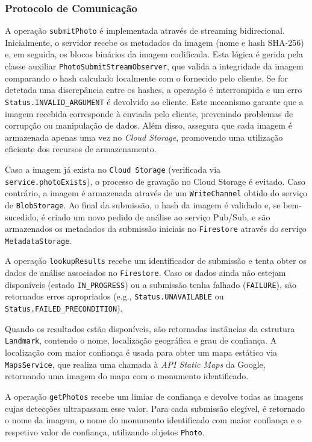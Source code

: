 \subsubsection{Protocolo de Comunicação}
\label{ssec:grpc_server_protocol}

A operação \texttt{submitPhoto} é implementada através de streaming
bidirecional. Inicialmente, o servidor recebe os metadados da imagem (nome e
hash SHA-256) e, em seguida, os blocos binários da imagem codificada. Esta
lógica é gerida pela classe auxiliar \texttt{PhotoSubmitStreamObserver}, que
valida a integridade da imagem comparando o hash calculado localmente com o
fornecido pelo cliente. Se for detetada uma discrepância entre os hashes, a
operação é interrompida e um erro \texttt{Status.INVALID\_ARGUMENT} é devolvido
ao cliente. Este mecanismo garante que a imagem recebida corresponde à enviada
pelo cliente, prevenindo problemas de corrupção ou manipulação de dados. Além
disso, assegura que cada imagem é armazenada apenas uma vez no \textit{Cloud
  Storage}, promovendo uma utilização eficiente dos recursos de armazenamento.

Caso a imagem já exista no \texttt{Cloud Storage} (verificada via
\texttt{service.photoExists}), o processo de gravação no Cloud Storage é
evitado. Caso contrário, a imagem é armazenada através de um
\texttt{WriteChannel} obtido do serviço de \texttt{BlobStorage}. Ao final da
submissão, o hash da imagem é validado e, se bem-sucedido, é criado um novo
pedido de análise ao serviço Pub/Sub, e são armazenados os metadados da
submissão iniciais no \texttt{Firestore} através do serviço
\texttt{MetadataStorage}.

A operação \texttt{lookupResults} recebe um identificador de submissão e tenta
obter os dados de análise associados no \texttt{Firestore}. Caso os dados ainda
não estejam disponíveis (estado \texttt{IN\_PROGRESS}) ou a submissão tenha
falhado (\texttt{FAILURE}), são retornados erros apropriados (e.g.,
\texttt{Status.UNAVAILABLE} ou \texttt{Status.FAILED\_PRECONDITION}).

Quando os resultados estão disponíveis, são retornadas instâncias da estrutura
\texttt{Landmark}, contendo o nome, localização geográfica e grau de confiança.
A localização com maior confiança é usada para obter um mapa estático via
\texttt{MapsService}, que realiza uma chamada à \textit{API Static Maps} da
Google, retornando uma imagem do mapa com o monumento identificado.

A operação \texttt{getPhotos} recebe um limiar de confiança e devolve todas as
imagens cujas detecções ultrapassam esse valor. Para cada submissão elegível, é
retornado o nome da imagem, o nome do monumento identificado com maior
confiança e o respetivo valor de confiança, utilizando objetos \texttt{Photo}.

